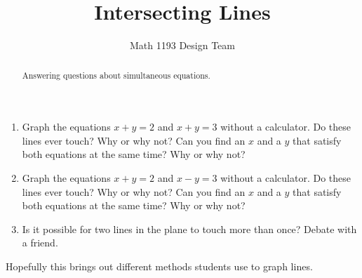 \documentclass[noauthor]{ximera}
\title{Intersecting Lines}
\author{Math 1193 Design Team}
\begin{document}
\begin{abstract}
    Answering questions about simultaneous equations.
\end{abstract}
\maketitle

\begin{enumerate}
    \item Graph the equations \(x + y = 2\) and \(x + y = 3\)
    without a calculator. Do these lines ever touch? Why or why not?
    Can you find an \(x\) and a \(y\) that satisfy both equations at 
    the same time? Why or why not? 
    \item Graph the equations \(x + y = 2\) and \(x - y = 3\)
    without a calculator. Do these lines ever touch? Why or why not?
    Can you find an \(x\) and a \(y\) that satisfy both equations at 
    the same time? Why or why not? 
    \item Is it possible for two lines in the 
    plane to touch more than once? Debate with a friend.
\end{enumerate}

\begin{instructorNotes}
Hopefully this brings out different methods students use to graph lines.
\end{instructorNotes}
\end{document}
